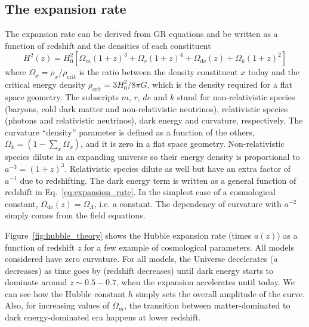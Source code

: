     \subsection{The expansion rate}
    \label{intro:model:expansion_rate}

    The expansion rate can be derived from GR equations and be written as a function of 
    redshift and the densities of each constituent
    \begin{equation}
        H^2(z) = H^2_0 \left[ \Omega_m(1+z)^3 + \Omega_r (1+z)^4 + \Omega_{\mathrm{de}}(z) + \Omega_k(1+z)^2\right]
        \label{eq:expansion_rate}
    \end{equation}
    where $\Omega_x = \rho_x / \rho_\mathrm{ crit}$ is the ratio between the density 
    constituent $x$ today and the critical energy density $\rho_\mathrm{ crit} = 3H_0^2/8\pi G$, 
    which is the density required for a flat space geometry. 
    The subscripts $m$, $r$, $de$ and $k$ stand
    for non-relativistic species (baryons, cold dark matter and non-relativistic neutrinos), 
    relativistic species (photons and relativistic neutrinos), dark energy and curvature, 
    respectively. The curvature ``density'' parameter is defined as a function of the others,
    $\Omega_k = (1-\sum_x \Omega_x)$, and it is zero in a flat space geometry.
    Non-relativistic species dilute in an expanding universe so their energy density is 
    proportional to $a^{-3} = (1+z)^3$. Relativistic species dilute as well but have an
    extra factor of $a^{-1}$ due to redshifting. 
    The dark energy term is written as a general function of redshift in Eq.~\ref{eq:expansion_rate}.
    In the simplest case of a cosmological constant, $\Omega_{\mathrm{de}}(z) = \Omega_\Lambda$, i.e. a constant.
    The dependency of curvature with $a^{-2}$ simply comes from the field equations. 

    Figure~\ref{fig:hubble_theory} shows the Hubble expansion rate (times $a(z)$) as a function of redshift $z$
    for a few example of cosmological parameters. All models considered have zero curvature. 
    For all models, the Universe decelerates ($\dot{a}$ decreases) as time goes by (redshift decreases) 
    until dark energy starts to dominate around $z\sim 0.5-0.7$, when the expansion accelerates until today. 
    We can see how the Hubble constant $h$ simply sets the overall amplitude of the curve.
    Also, for increasing values of $\Omega_m$, the transition between matter-dominated to dark energy-dominated era 
    happens at lower redshift. 

